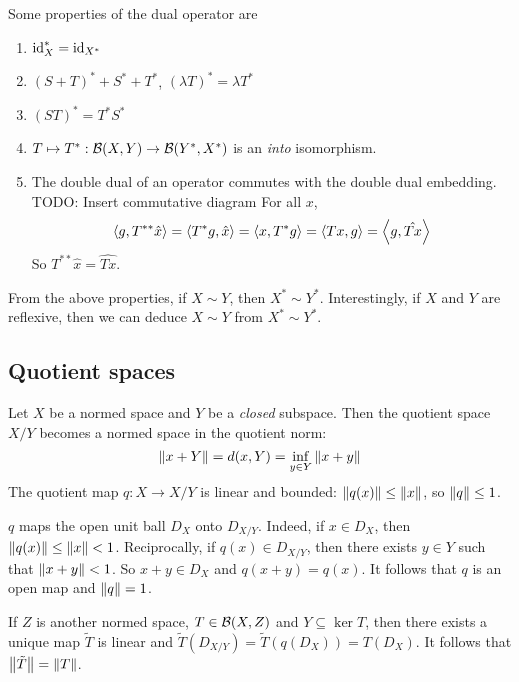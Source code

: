 \documentclass{article}
\begin{document}
Some properties of the dual operator are
\begin{enumerate}
  \item $\operatorname{id}_X^* = \operatorname{id}_{X^*}$
  \item $(S + T)^* + S^* + T^*$, $(\lambda T)^* = \lambda T^*$
  \item $(ST)^* = T^*S^*$
  \item $T \mapsto T^* : \mathcal B(X, Y) \to \mathcal B(Y^*, X^*)$ is an {\it into} isomorphism.
  \item The double dual of an operator commutes with the double dual embedding. \\
    TODO: Insert commutative diagram
    For all $x$,
    $$\left\langle g, T^{**}\hat x\right\rangle = \left\langle T^*g, \hat x\right\rangle = \left\langle x, T^*g\right\rangle = \left\langle Tx, g\right\rangle = \left\langle g, \hat{Tx}\right\rangle$$
    So $T^{**}\hat x = \widehat{Tx}$.
\end{enumerate}

\begin{rmk}
  From the above properties, if $X \sim Y$, then $X^* \sim Y^*$. Interestingly, if $X$ and $Y$ are reflexive, then we can deduce $X \sim Y$ from $X^* \sim Y^*$.
\end{rmk}

\subsection{Quotient spaces}

Let $X$ be a normed space and $Y$ be a {\it closed} subspace. Then the quotient space $X / Y$ becomes a normed space in the quotient norm:
$$\left\lVert x + Y\right\rVert = d(x, Y) = \inf_{y \in Y} \left\lVert x + y\right\rVert$$
The quotient map $q : X \to X/Y$ is linear and bounded: $\left\lVert q(x)\right\rVert \le \left\lVert x\right\rVert$, so $\left\lVert q\right\rVert \le 1$.

$q$ maps the open unit ball $D_X$ onto $D_{X/Y}$. Indeed, if $x \in D_X$, then $\left\lVert q(x)\right\rVert \le \left\lVert x\right\rVert < 1$. Reciprocally, if $q(x) \in D_{X/Y}$, then there exists $y \in Y$ such that $\left\lVert x + y\right\rVert < 1$. So $x + y \in D_X$ and $q(x + y) = q(x)$. It follows that $q$ is an open map and $\left\lVert q\right\rVert = 1$.

If $Z$ is another normed space, $T \in \mathcal B(X, Z)$ and $Y \subseteq \ker T$, then there exists a unique map $\tilde T$ is linear and $\tilde T(D_{X/Y}) = \tilde T(q(D_X)) = T(D_X)$. It follows that $\left\lVert \tilde T\right\rVert = \left\lVert T\right\rVert$.
\end{document}

